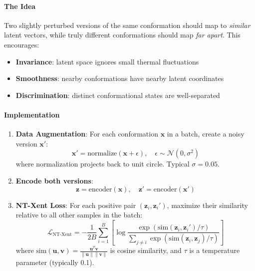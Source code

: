 \documentclass[12pt,a4paper]{article}
\begin{document}
\paragraph{The Idea}
Two slightly perturbed versions of the same conformation should map to \textit{similar} latent vectors, while truly different conformations should map \textit{far apart}. This encourages:
\begin{itemize}
    \item \textbf{Invariance}: latent space ignores small thermal fluctuations
    \item \textbf{Smoothness}: nearby conformations have nearby latent coordinates
    \item \textbf{Discrimination}: distinct conformational states are well-separated
\end{itemize}

\paragraph{Implementation}
\begin{enumerate}
    \item \textbf{Data Augmentation}: For each conformation $\mathbf{x}$ in a batch, create a noisy version $\mathbf{x}'$:
    \begin{equation}
    \mathbf{x}' = \text{normalize}(\mathbf{x} + \epsilon), \quad \epsilon \sim \mathcal{N}(0, \sigma^2)
    \end{equation}
    where normalization projects back to unit circle. Typical $\sigma = 0.05$.

    \item \textbf{Encode both versions}:
    \begin{equation}
    \mathbf{z} = \text{encoder}(\mathbf{x}), \quad \mathbf{z}' = \text{encoder}(\mathbf{x}')
    \end{equation}

    \item \textbf{NT-Xent Loss}: For each positive pair $(\mathbf{z}_i, \mathbf{z}_i')$, maximize their similarity relative to all other samples in the batch:
    \begin{equation}
    \mathcal{L}_{\text{NT-Xent}} = -\frac{1}{2B} \sum_{i=1}^{B} \left[\log \frac{\exp(\text{sim}(\mathbf{z}_i, \mathbf{z}_i')/\tau)}{\sum_{j \neq i} \exp(\text{sim}(\mathbf{z}_i, \mathbf{z}_j)/\tau)}\right]
    \end{equation}
    where $\text{sim}(\mathbf{u}, \mathbf{v}) = \frac{\mathbf{u}^T \mathbf{v}}{\|\mathbf{u}\|\|\mathbf{v}\|}$ is cosine similarity, and $\tau$ is a temperature parameter (typically 0.1).
\end{enumerate}
\end{document}

